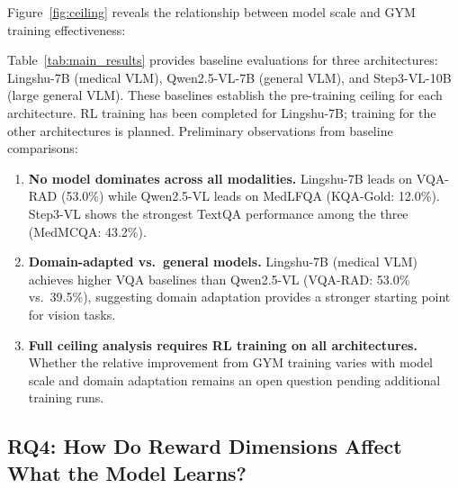 \documentclass{article}
\begin{document}
Figure~\ref{fig:ceiling} reveals the relationship between model scale and GYM training effectiveness:

Table~\ref{tab:main_results} provides baseline evaluations for three architectures: Lingshu-7B (medical VLM), Qwen2.5-VL-7B (general VLM), and Step3-VL-10B (large general VLM). These baselines establish the pre-training ceiling for each architecture. RL training has been completed for Lingshu-7B; training for the other architectures is planned. Preliminary observations from baseline comparisons:

\begin{enumerate}[nosep, leftmargin=*]
    \item \textbf{No model dominates across all modalities.} Lingshu-7B leads on VQA-RAD (53.0\%) while Qwen2.5-VL leads on MedLFQA (KQA-Gold: 12.0\%). Step3-VL shows the strongest TextQA performance among the three (MedMCQA: 43.2\%).
    \item \textbf{Domain-adapted vs.\ general models.} Lingshu-7B (medical VLM) achieves higher VQA baselines than Qwen2.5-VL (VQA-RAD: 53.0\% vs.\ 39.5\%), suggesting domain adaptation provides a stronger starting point for vision tasks.
    \item \textbf{Full ceiling analysis requires RL training on all architectures.} Whether the relative improvement from GYM training varies with model scale and domain adaptation remains an open question pending additional training runs.
\end{enumerate}

\subsection{RQ4: How Do Reward Dimensions Affect What the Model Learns?}
\label{sec:rq4}
\end{document}
